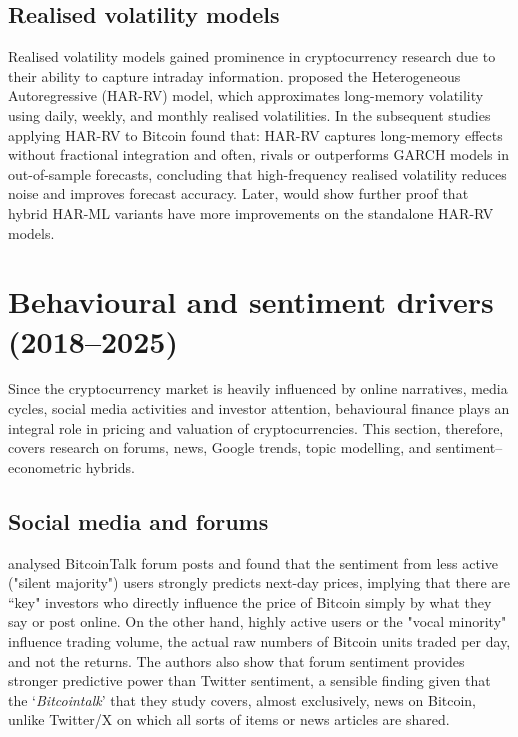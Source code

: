 \documentclass[12pt]{report}
\begin{document}
\subsection{Realised volatility models}

Realised volatility models gained prominence in cryptocurrency research due to their ability to capture intraday information. \cite{corsi2009har} proposed the Heterogeneous Autoregressive (HAR-RV) model, which approximates long-memory volatility using daily, weekly, and monthly realised volatilities. In the subsequent studies applying HAR-RV to Bitcoin found that: HAR-RV captures long-memory effects without fractional integration and often, rivals or outperforms GARCH models in out-of-sample forecasts, concluding that high-frequency realised volatility reduces noise and improves forecast accuracy. Later,  \cite{dudek2023bitcoinrv} would show further proof that hybrid HAR-ML variants have more improvements on the standalone HAR-RV models.

\section{Behavioural and sentiment drivers (2018–2025)}
Since the cryptocurrency market is heavily influenced by online narratives, media cycles, social media activities and investor attention, behavioural finance plays an integral role in pricing and valuation of cryptocurrencies. This section, therefore, covers research on forums, news, Google trends, topic modelling, and sentiment–econometric hybrids.

\subsection{Social media and forums}

\cite{mai2018silentmajority} analysed BitcoinTalk forum posts and found that the sentiment from less active ("silent majority") users strongly predicts next-day prices, implying that there are ``key" investors who directly influence the price of Bitcoin simply by what they say or post online. On the other hand, highly active users or the "vocal minority" influence trading volume, the actual raw numbers of Bitcoin units traded per day, and not the returns. The authors also show that forum sentiment provides stronger predictive power than Twitter sentiment, a sensible finding given that the `\textit{Bitcointalk}' that they study covers, almost exclusively, news on Bitcoin, unlike Twitter/X on which all sorts of items or news articles are shared.
\end{document}
